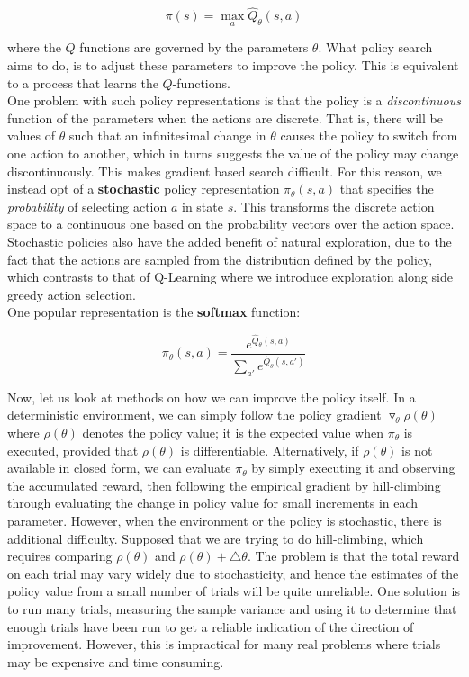 \documentclass[11pt]{article}
\begin{document}
$$
\pi(s) = \max_a \hat{Q}_{\theta}(s, a)
$$

where the $Q$ functions are governed by the parameters $\theta$. What policy search aims to do, is to adjust these parameters to improve the policy. This is equivalent to a process that learns the $Q$-functions.\\

One problem with such policy representations is that the policy is a \textit{discontinuous} function of the parameters when the actions are discrete. That is, there will be values of $\theta$ such that an infinitesimal change in $\theta$ causes the policy to switch from one action to another, which in turns suggests the value of the policy may change discontinuously. This makes gradient based search difficult. For this reason, we instead opt of a \textbf{stochastic} policy representation $\pi_{\theta}(s, a)$ that specifies the \textit{probability} of selecting action $a$ in  state $s$. This transforms the discrete action space to a continuous one based on the probability vectors over the action space. Stochastic policies also have the added benefit of natural exploration, due to the fact that the actions are sampled from the distribution defined by the policy, which contrasts to that of Q-Learning where we introduce exploration along side greedy action selection.\\

One popular representation is the \textbf{softmax} function:

$$
\pi_{\theta}(s, a)
 = \frac{e^{\hat{Q}_{\theta}(s, a)}}{\sum_{a'}e^{\hat{Q}_{\theta}(s, a')}}
$$

Now, let us look at methods on how we can improve the policy itself. In a deterministic environment, we can simply follow the policy gradient $\triangledown_{\theta} \rho(\theta)$ where $\rho(\theta)$ denotes the policy value; it is the expected value when $\pi_{\theta}$ is executed, provided that $\rho(\theta)$ is differentiable. Alternatively, if $\rho(\theta)$ is not available in closed form, we can evaluate $\pi_{\theta}$ by simply executing it and observing the accumulated reward, then following the empirical gradient by hill-climbing through evaluating the change in policy value for small increments in each parameter. However, when the environment or the policy is stochastic, there is additional difficulty. Supposed that we are trying to do hill-climbing, which requires comparing $\rho(\theta)$ and $\rho(\theta) + \triangle \theta$. The problem is that the total reward on each trial may vary widely due to stochasticity, and hence the estimates of the policy value from a small number of trials will be quite unreliable. One solution is to run many trials, measuring the sample variance and using it to determine that enough trials have been run to get a reliable indication of the direction of improvement. However, this is impractical for many real problems where trials may be expensive and time consuming.\\
\end{document}
